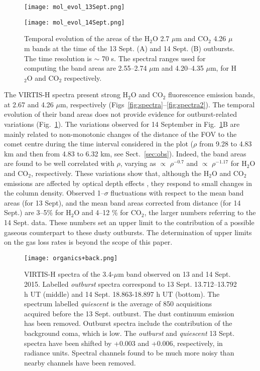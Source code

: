 \documentclass[a4paper,fleqn,usenatbib]{mnras}
\begin{document}
  \begin{figure}
    \texttt{[image: mol\_evol\_13Sept.png]}
           \par
\vspace{0.3cm}
    \texttt{[image: mol\_evol\_14Sept.png]}
           \par
\vspace{0.3cm}
    \caption{Temporal evolution of the areas of the H$_2$O 2.7 $\mu$m and CO$_2$ 4.26 $\mu$m bands at the time of the 13 Sept. (A) and 14 Sept. (B) outbursts. The time resolution is $\sim$ 70 s. The spectral ranges used for computing the band areas are 2.55--2.74 $\mu$m and 4.20--4.35 $\mu$m, for H$_2$O and CO$_2$  respectively. }
    \label{fig:mol-evolv}
\end{figure}

The VIRTIS-H spectra present strong H$_2$O and CO$_2$ fluorescence emission bands, at 2.67 and 4.26 $\mu$m, respectively (Figs~\ref{fig:spectra}--\ref{fig:spectra2}).
The temporal evolution of their band areas does not provide evidence for outburst-related variations (Fig.~\ref{fig:mol-evolv}). The variations observed for 14 September
in Fig.~\ref{fig:mol-evolv}B are mainly related to non-monotonic changes of the distance of the FOV to the comet centre during the time interval considered in the plot ($\rho$ from 9.28 to 4.83 km and then from 4.83 to 6.32 km, see Sect.~\ref{sec:obs}). Indeed, the band areas are found to be well correlated with $\rho$, varying as $\propto$ $\rho^{-0.7}$
and $\propto$ $\rho^{-1.17}$ for H$_2$O and CO$_2$, respectively. These variations show that, although the H$_2$O and CO$_2$ emissions are affected by optical depth effects \citep{dbm2016}, they respond to small changes in the column density. Observed 1--$\sigma$ fluctuations with respect to the mean band areas (for 13 Sept), and the mean band areas
corrected from distance (for 14 Sept.) are 3--5\% for H$_2$O and 4--12 \% for CO$_2$, the larger numbers referring to the 14 Sept. data. These numbers set an  upper limit to the contribution of a possible gaseous counterpart to these dusty outbursts. The determination of upper limits on the gas loss rates is beyond the scope of this paper.

  \begin{figure}
    \texttt{[image: organics+back.png]}
    \caption{VIRTIS-H spectra of the 3.4-$\mu$m band observed on 13 and 14 Sept. 2015.  Labelled {\it outburst} spectra correspond to 13 Sept. 13.712--13.792 h UT (middle) and 14 Sept. 18.863-18.897 h UT (bottom). The spectrum labelled {\it quiescent} is the average of 850 acquisitions acquired before the 13 Sept. outburst.  The dust continuum emission has been removed. Outburst spectra include the contribution of the background coma, which is low. The {\it outburst} and {\it quiescent} 13 Sept. spectra have been shifted by +0.003 and +0.006, respectively, in radiance units. Spectral channels found to be much more noisy than nearby channels have been removed. }
    \label{fig:organics}
\end{figure}
\end{document}
